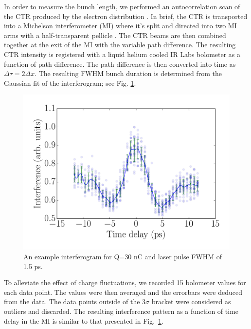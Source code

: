 In order to measure the bunch length, we performed an autocorrelation scan
of the CTR produced by the electron distribution \cite{Happek, WBarry}.
In brief, the CTR is transported into a Michelson interferometer (MI)
where it's split and directed into two MI arms with a half-transparent pellicle \cite{PhysRevSTAB.9.082801}. 
The CTR beams are then combined together at the exit of the MI with the variable path difference.
The resulting CTR intensity is registered with a liquid helium cooled IR Labs
bolometer \cite{IRlabs} as a function of path difference.
The path difference is then converted into time as $\Delta \tau = 2 \Delta x$.
The resulting FWHM bunch duration is determined from the Gaussian fit of 
the interferogram; see Fig. \ref{interferogram}.
\begin{figure}
	\includegraphics[width=1.0\linewidth]{images/THPMF048f1}
	\caption{An example interferogram for Q=30 nC and laser pulse FWHM of 1.5 ps.}
	\label{interferogram}
\end{figure}
To alleviate the effect of charge fluctuations, we recorded 15 bolometer values for each data point.
The values were then averaged and the errorbars were deduced from the data. The data points
outside of the 3$\sigma$ bracket were considered as outliers and discarded. The resulting
interference pattern as a function of time delay in the MI is similar to that presented in Fig.~\ref{interferogram}.

